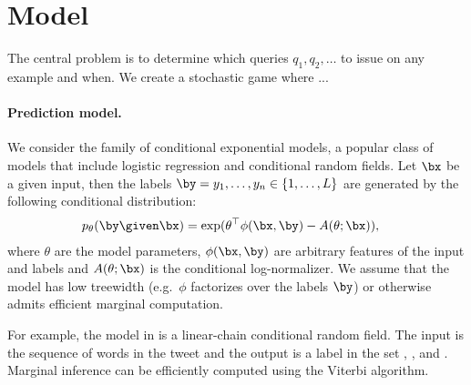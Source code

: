 \section{Model}
\label{sec:model}

The central problem is to determine which queries $q_1, q_2, \dots$ to issue on
any example and when.  We create a stochastic game where ...



\paragraph{Prediction model.}
We consider the family of conditional exponential models, a popular class of models that include logistic regression and conditional random fields.
Let $\bx$ be a given input, then the labels $\by = y_1, \ldots, y_n \in \{1, \dots, L\}$ are generated by the following conditional distribution:
\begin{align*}
  \p(\by \given \bx) 
  &= \exp( \theta^\top \phi(\bx, \by) - A(\theta; \bx)),
\end{align*}
where $\theta$ are the model parameters,
$\phi(\bx, \by)$ are arbitrary features of the input and labels and 
$A(\theta; \bx)$ is the conditional log-normalizer.
We assume that the model has low treewidth (e.g.\ $\phi$ factorizes over the labels $\by$) or otherwise admits efficient marginal computation.

For example, the model in  is a linear-chain conditional random field. The input is the sequence of words in the tweet and the output is a label in the set \scnone, \scres, \scloc{} and \scper. Marginal inference can be efficiently computed using the Viterbi algorithm.


